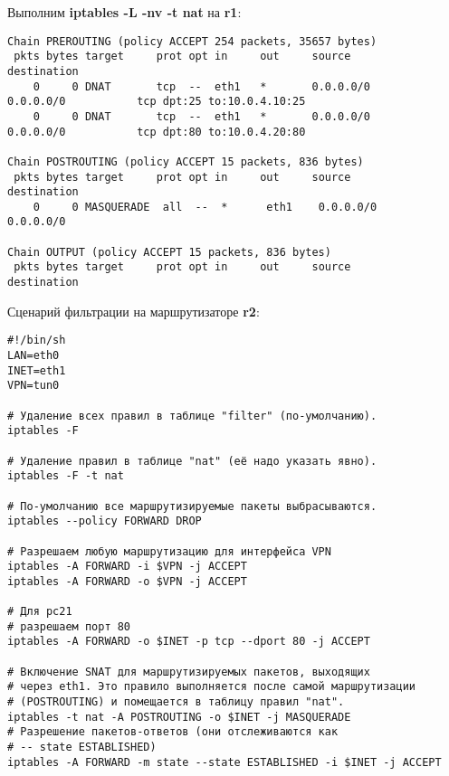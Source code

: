 \documentclass[a4paper,12pt]{article}
\begin{document}
Выполним \textbf{iptables -L -nv -t nat} на \textbf{r1}:
\begin{Verbatim}
Chain PREROUTING (policy ACCEPT 254 packets, 35657 bytes)
 pkts bytes target     prot opt in     out     source               destination         
    0     0 DNAT       tcp  --  eth1   *       0.0.0.0/0            0.0.0.0/0           tcp dpt:25 to:10.0.4.10:25 
    0     0 DNAT       tcp  --  eth1   *       0.0.0.0/0            0.0.0.0/0           tcp dpt:80 to:10.0.4.20:80 

Chain POSTROUTING (policy ACCEPT 15 packets, 836 bytes)
 pkts bytes target     prot opt in     out     source               destination         
    0     0 MASQUERADE  all  --  *      eth1    0.0.0.0/0            0.0.0.0/0           

Chain OUTPUT (policy ACCEPT 15 packets, 836 bytes)
 pkts bytes target     prot opt in     out     source               destination
\end{Verbatim}

Сценарий фильтрации на маршрутизаторе \textbf{r2}:

\begin{Verbatim}
#!/bin/sh
LAN=eth0
INET=eth1
VPN=tun0

# Удаление всех правил в таблице "filter" (по-умолчанию).
iptables -F

# Удаление правил в таблице "nat" (её надо указать явно).
iptables -F -t nat

# По-умолчанию все маршрутизируемые пакеты выбрасываются.
iptables --policy FORWARD DROP

# Разрешаем любую маршрутизацию для интерфейса VPN
iptables -A FORWARD -i $VPN -j ACCEPT
iptables -A FORWARD -o $VPN -j ACCEPT

# Для pc21
# разрешаем порт 80
iptables -A FORWARD -o $INET -p tcp --dport 80 -j ACCEPT

# Включение SNAT для маршрутизируемых пакетов, выходящих
# через eth1. Это правило выполняется после самой маршрутизации
# (POSTROUTING) и помещается в таблицу правил "nat".
iptables -t nat -A POSTROUTING -o $INET -j MASQUERADE
# Разрешение пакетов-ответов (они отслеживаются как
# -- state ESTABLISHED)
iptables -A FORWARD -m state --state ESTABLISHED -i $INET -j ACCEPT
\end{Verbatim}
\end{document}
